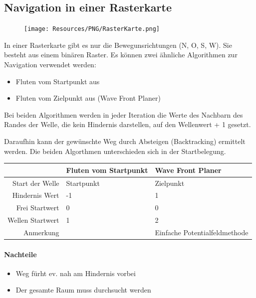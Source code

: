 \subsection{Navigation in einer Rasterkarte}
{
\begin{figure}
	\texttt{[image: Resources/PNG/RasterKarte.png]}
\end{figure}
In einer Rasterkarte gibt es nur die Bewegunsrichtungen (N, O, S, W). Sie
besteht aus einem binären Raster. Es können zwei ähnliche Algorithmen zur
Navigation verwendet werden:
\begin{itemize}
	\item Fluten vom Startpunkt aus
	\item Fluten vom Zielpunkt aus (Wave Front Planer)
\end{itemize}
Bei beiden Algorithmen werden in jeder Iteration die Werte des Nachbarn des
Randes der Welle, die kein Hindernis darstellen, auf den Wellenwert + 1 gesetzt.

Daraufhin kann der gewünschte Weg durch Absteigen (Backtracking) ermittelt
werden. Die beiden Algorthmen unterschieden sich in der Startbelegung.

}

\begin{table}
\centering
\begin{tabular}{r|l|l}
							  & \textbf{Fluten vom Startpunkt} & \textbf{Wave Front Planer} \\
\hline
Start der Welle & Startpunkt                     & Zielpunkt                  \\
Hindernis Wert  & -1                             & 1                          \\
Frei Startwert  & 0                              & 0                          \\
Wellen Startwert& 1                              & 2                          \\
Anmerkung       &                                & Einfache Potentialfeldmethode
\end{tabular}
\end{table}

\paragraph{Nachteile}
\begin{itemize}
	\item Weg fürht ev. nah am Hindernis vorbei
	\item Der gesamte Raum muss durchsucht werden
\end{itemize}

